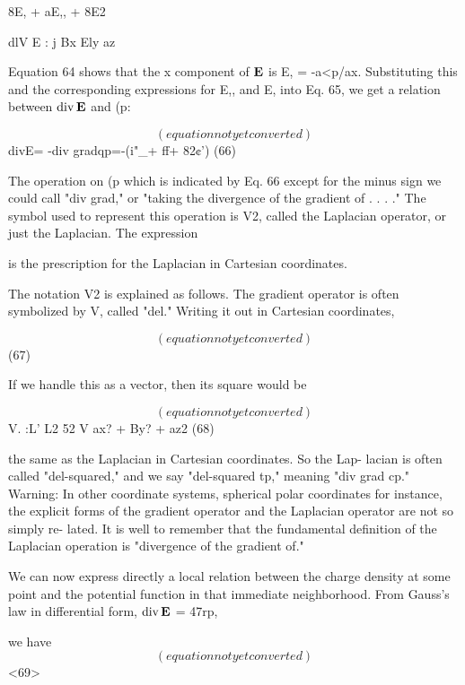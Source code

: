 8E, + aE,, + 8E2

dlV E : j
Bx Ely az

Equation 64 shows that the x component of $\mathbf{E}$ is E, = -a<p/ax.
Substituting this and the corresponding expressions for E,, and E,
into Eq. 65, we get a relation between $\operatorname{div}\mathbf{E}$ and (p:

\begin{equation}
(equation not yet converted)
\end{equation}
divE= -div gradqp=-(i"_+ ff+ 82¢') (66)

The operation on (p which is indicated by Eq. 66 except for the minus
sign we could call "div grad," or "taking the divergence of the
gradient of . . . ." The symbol used to represent this operation is V2,
called the Laplacian operator, or just the Laplacian. The expression

is the prescription for the Laplacian in Cartesian coordinates.

The notation V2 is explained as follows. The gradient operator is
often symbolized by V, called "del." Writing it out in Cartesian
coordinates,

\begin{equation}
(equation not yet converted)
\end{equation}
(67)

If we handle this as a vector, then its square would be

\begin{equation}
(equation not yet converted)
\end{equation}
V. :L' L2 52
V ax? + By? + az2 (68)

the same as the Laplacian in Cartesian coordinates. So the Lap-
lacian is often called "del-squared," and we say "del-squared tp,"
meaning "div grad cp." Warning: In other coordinate systems,
spherical polar coordinates for instance, the explicit forms of the
gradient operator and the Laplacian operator are not so simply re-
lated. It is well to remember that the fundamental definition of the
Laplacian operation is "divergence of the gradient of."

We can now express directly a local relation between the charge
density at some point and the potential function in that immediate
neighborhood. From Gauss's law in differential form, $\operatorname{div}\mathbf{E}$ = 47rp,

we have
\begin{equation}
(equation not yet converted)
\end{equation}
<69>

